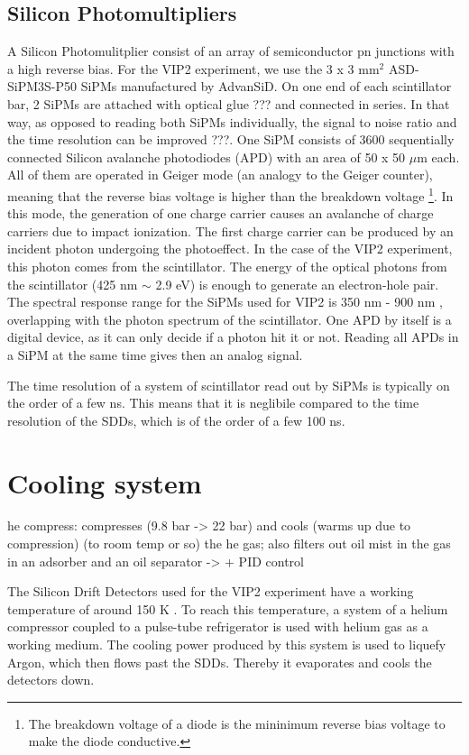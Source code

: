 \subsection{Silicon Photomultipliers}

A Silicon Photomulitplier consist of an array of semiconductor pn junctions with a high reverse bias. For the VIP2 experiment, we use the 3 x 3 mm$^{2}$ ASD-SiPM3S-P50 SiPMs manufactured by AdvanSiD. On one end of each scintillator bar, 2 SiPMs are attached with optical glue ??? and connected in series. In that way, as opposed to reading both SiPMs individually, the signal to noise ratio and the time resolution can be improved ???. One SiPM consists of 3600 sequentially connected Silicon avalanche photodiodes (APD) with an area of 50 x 50 $\mu$m each. All of them are operated in Geiger mode (an analogy to the Geiger counter), meaning that the reverse bias voltage is higher than the breakdown voltage \footnote{The breakdown voltage of a diode is the mininimum reverse bias voltage to make the diode conductive.}. In this mode, the generation of one charge carrier causes an avalanche of charge carriers due to impact ionization. The first charge carrier can be produced by an incident photon undergoing the photoeffect. In the case of the VIP2 experiment, this photon comes from the scintillator. The energy of the optical photons from the scintillator (425 nm $\sim$ 2.9 eV) is enough to generate an electron-hole pair. The spectral response range for the SiPMs used for VIP2 is 350 nm - 900 nm \cite{AdvanSiD2012}, overlapping with the photon spectrum of the scintillator. One APD by itself is a digital device, as it can only decide if a photon hit it or not. Reading all APDs in a SiPM at the same time gives then an analog signal.

The time resolution of a system of scintillator read out by SiPMs is typically on the order of a few ns. This means that it is neglibile compared to the time resolution of the SDDs, which is of the order of a few 100 ns.

\section{Cooling system}

he compress: compresses (9.8 bar -> 22 bar) and cools (warms up due to compression) (to room temp or so) the he gas; also filters out oil mist in the gas in an adsorber and an oil separator
-> + PID control

The Silicon Drift Detectors used for the VIP2 experiment have a working temperature of around 150 K \cite{Lechner}. To reach this temperature, a system of a helium compressor coupled to a pulse-tube refrigerator is used with helium gas as a working medium. The cooling power produced by this system is used to liquefy Argon, which then flows past the SDDs. Thereby it evaporates and cools the detectors down. 

